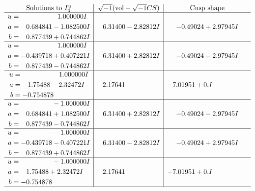 \documentclass[1p]{elsarticle_modified}
\theoremstyle{definition}
\newcommand{\I}{\sqrt{-1}}
\begin{document}
$$\begin{array}{c|c|c}  
\text{Solutions to }I^u_{4}& \I (\text{vol} + \sqrt{-1}CS) & \text{Cusp shape}\\
 \hline 
\begin{aligned}
u &= \phantom{-0.000000 -}1.000000 I \\
a &= \phantom{-}0.684841 - 1.082500 I \\
b &= \phantom{-}0.877439 + 0.744862 I\end{aligned}
 & \phantom{-}6.31400 - 2.82812 I & -0.49024 + 2.97945 I \\ \hline\begin{aligned}
u &= \phantom{-0.000000 -}1.000000 I \\
a &= -0.439718 + 0.407221 I \\
b &= \phantom{-}0.877439 - 0.744862 I\end{aligned}
 & \phantom{-}6.31400 + 2.82812 I & -0.49024 - 2.97945 I \\ \hline\begin{aligned}
u &= \phantom{-0.000000 -}1.000000 I \\
a &= \phantom{-}1.75488 - 2.32472 I \\
b &= -0.754878\phantom{ +0.000000I}\end{aligned}
 & \phantom{-}2.17641\phantom{ +0.000000I} & -7.01951 + 0. I\phantom{ +0.000000I} \\ \hline\begin{aligned}
u &= \phantom{-0.000000 } -1.000000 I \\
a &= \phantom{-}0.684841 + 1.082500 I \\
b &= \phantom{-}0.877439 - 0.744862 I\end{aligned}
 & \phantom{-}6.31400 + 2.82812 I & -0.49024 - 2.97945 I \\ \hline\begin{aligned}
u &= \phantom{-0.000000 } -1.000000 I \\
a &= -0.439718 - 0.407221 I \\
b &= \phantom{-}0.877439 + 0.744862 I\end{aligned}
 & \phantom{-}6.31400 - 2.82812 I & -0.49024 + 2.97945 I \\ \hline\begin{aligned}
u &= \phantom{-0.000000 } -1.000000 I \\
a &= \phantom{-}1.75488 + 2.32472 I \\
b &= -0.754878\phantom{ +0.000000I}\end{aligned}
 & \phantom{-}2.17641\phantom{ +0.000000I} & -7.01951 + 0. I\phantom{ +0.000000I}\\
 \hline 
 \end{array}$$\newpage\newpage\renewcommand{\arraystretch}{1}
\end{document}
